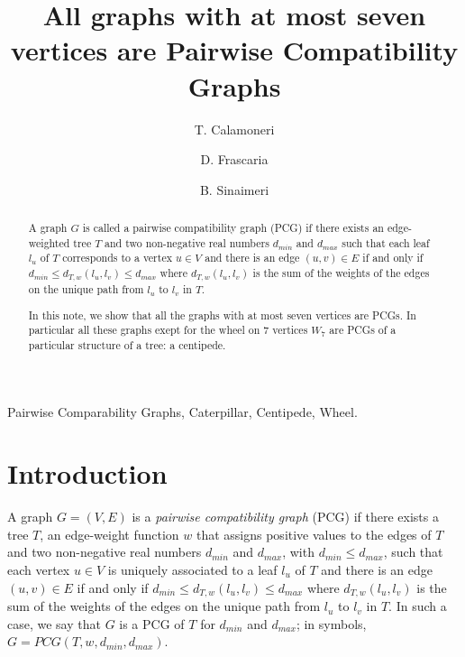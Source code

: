 \documentclass[review]{elsarticle}
\begin{document}
\begin{frontmatter}

\title{All graphs with at most seven vertices are Pairwise Compatibility Graphs}

\author[rvt]{T. Calamoneri}

\author[rvt]{D. Frascaria}

\author[rvt]{B. Sinaimeri}


\address[rvt]{Department of Computer Science, ``Sapienza'' University of Rome, Via Salaria 113, 00198 Roma, Italy}




\begin{abstract}
A graph $G$ is called a pairwise compatibility graph (PCG) if there exists an edge-weighted tree $T$ and two non-negative real numbers $d_{min}$ and $d_{max}$ such that each leaf $l_u$ of $T$ corresponds to a vertex $u \in V$ and there is an edge $(u,v) \in E$ if and only if $d_{min} \leq d_{T,w} (l_u, l_v) \leq d_{max}$ where $d_{T,w} (l_u, l_v)$ is the sum of the weights of the edges on the unique path from $l_u$ to $l_v$ in $T$.  

In this note, we show that  all the graphs with at most seven vertices are PCGs.  In particular all these graphs  exept for the wheel on $7$ vertices $W_7$ are PCGs of a particular structure of a tree: a centipede. 
\end{abstract}

\begin{keyword} 
Pairwise Comparability Graphs,
Caterpillar,
Centipede,
Wheel.
\end{keyword}

\end{frontmatter}
\section{Introduction}


A graph $G=(V,E)$ is a {\em pairwise compatibility graph} (PCG) if there exists a tree $T$, an edge-weight function  $w$ that assigns positive values to the edges of $T$ and  two non-negative real numbers $d_{min}$ and $d_{max}$, with $d_{min} \leq d_{max}$, such that each vertex $u \in V$ is uniquely associated to a leaf $l_u$ of $T$ and there is an edge $(u,v) \in E$ if and only if $d_{min} \leq d_{T,w} (l_u, l_v) \leq d_{max}$ where $d_{T,w} (l_u, l_v)$ is the sum of the weights of the edges on the unique path from $l_u$ to $l_v$ in $T$. In such a case, we say that $G$ is a PCG of $T$ for $d_{min}$ and $d_{max}$; in symbols, $G=PCG(T, w, d_{min}, d_{max})$.
\end{document}
